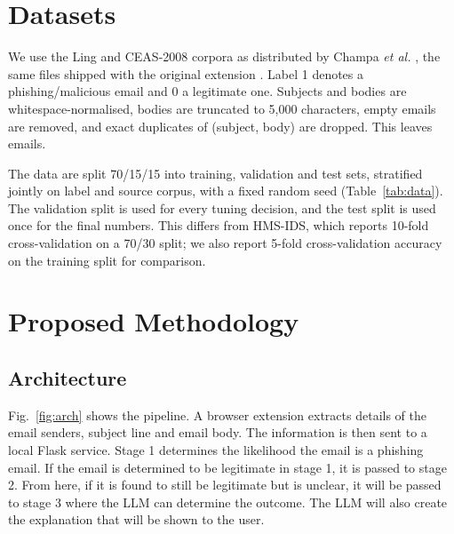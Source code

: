 \documentclass[conference]{IEEEtran}
\begin{document}
\section{Datasets}
We use the Ling and CEAS-2008 corpora as distributed by Champa \emph{et al.} \cite{champa2023zenodo}, the same files shipped with the original extension \cite{cmpe209repo}. Label 1 denotes a phishing/malicious email and 0 a legitimate one. Subjects and bodies are whitespace-normalised, bodies are truncated to 5,000 characters, empty emails are removed, and exact duplicates of (subject, body) are dropped. This leaves \NTotal{} emails.

The data are split 70/15/15 into training, validation and test sets, stratified jointly on label and source corpus, with a fixed random seed (Table~\ref{tab:data}). The validation split is used for every tuning decision, and the test split is used once for the final numbers. This differs from HMS-IDS, which reports 10-fold cross-validation on a 70/30 split; we also report 5-fold cross-validation accuracy on the training split for comparison.

\begin{table}[t]
\centering
\caption{Data splits (stratified on label and corpus)}
\label{tab:data}

\end{table}

\section{Proposed Methodology}
\subsection{Architecture}
Fig.~\ref{fig:arch} shows the pipeline. A browser extension extracts details of the email senders, subject line and email body. The information is then sent to a local Flask service. Stage 1 determines the likelihood the email is a phishing email. If the email is determined to be legitimate in stage 1, it is passed to stage 2. From here, if it is found to still be legitimate but is unclear, it will be passed to stage 3 where the LLM can determine the outcome. The LLM will also create the explanation that will be shown to the user.
\end{document}
